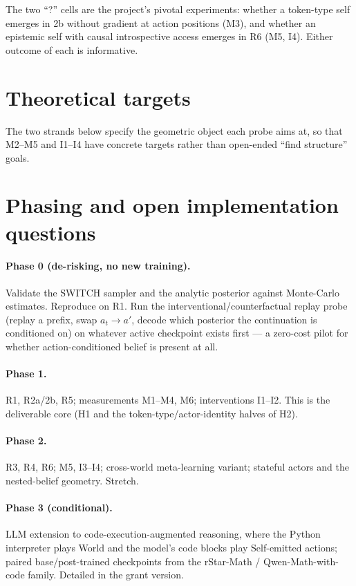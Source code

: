 \documentclass[11pt]{article}
\begin{document}
\noindent The two ``?'' cells are the project's pivotal experiments: whether a
token-type self emerges in 2b without gradient at action positions (M3), and
whether an epistemic self with causal introspective access emerges in R6 (M5,
I4). Either outcome of each is informative.

\section{Theoretical targets}

The two strands below specify the geometric object each probe aims at, so that
M2--M5 and I1--I4 have concrete targets rather than open-ended ``find
structure'' goals.





\section{Phasing and open implementation questions}

\paragraph{Phase 0 (de-risking, no new training).} Validate the SWITCH sampler
and the analytic posterior against Monte-Carlo estimates. Reproduce
\citep{shai2024belief} on R1. Run the interventional/counterfactual replay probe
(replay a prefix, swap $a_t\to a'$, decode which posterior the continuation is
conditioned on) on whatever active checkpoint exists first --- a zero-cost
pilot for whether action-conditioned belief is present at all.

\paragraph{Phase 1.} R1, R2a/2b, R5; measurements M1--M4, M6; interventions
I1--I2. This is the deliverable core (H1 and the token-type/actor-identity halves
of H2).

\paragraph{Phase 2.} R3, R4, R6; M5, I3--I4; cross-world meta-learning variant;
stateful actors and the nested-belief geometry. Stretch.

\paragraph{Phase 3 (conditional).} LLM extension to code-execution-augmented
reasoning, where the Python interpreter plays World and the model's code blocks
play Self-emitted actions; paired base/post-trained checkpoints from the
rStar-Math / Qwen-Math-with-code family. Detailed in the grant version.
\end{document}
